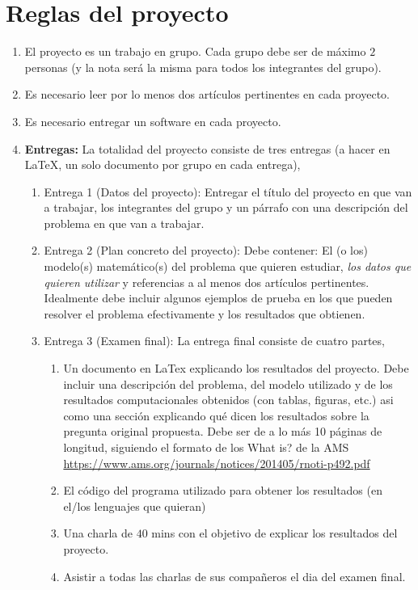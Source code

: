 \documentclass[12pt, a4paper]{article}
\begin{document}
\section{Reglas del proyecto}
\begin{enumerate}
\item{El proyecto es un trabajo en grupo. Cada grupo debe ser de m\'aximo $2$ personas (y la nota ser\'a la misma para todos los integrantes del grupo).}
\item{Es necesario leer por lo menos dos art\'iculos pertinentes en cada proyecto.}
\item{Es necesario entregar un software en cada proyecto. }
\item{{\bf Entregas:} La totalidad del proyecto consiste de tres entregas (a hacer en LaTeX, un solo documento por grupo en cada entrega),
\begin{enumerate}
\item{Entrega 1 (Datos del proyecto): Entregar el t\'itulo del proyecto en que van a trabajar, los integrantes del grupo y un p\'arrafo con una descripci\'on del problema en que van a trabajar.}
\item{Entrega 2 (Plan concreto del proyecto): Debe contener: El (o los) modelo(s) matem\'atico(s) del problema que quieren estudiar, {\it los datos que quieren utilizar} y referencias a al menos dos art\'iculos pertinentes. Idealmente debe incluir algunos ejemplos de prueba en los que pueden resolver el problema efectivamente y los resultados que obtienen.}
\item{Entrega 3 (Examen final): La entrega final consiste de cuatro partes,
\begin{enumerate}
\item{Un documento en LaTex explicando los resultados del proyecto. Debe incluir una descripci\'on del problema, del modelo utilizado y de los resultados computacionales obtenidos (con tablas, figuras, etc.) asi como una secci\'on explicando qu\'e dicen los resultados sobre la pregunta original propuesta. Debe ser de a lo m\'as 10 p\'aginas de longitud, siguiendo el formato de los What is? de la AMS
\url{https://www.ams.org/journals/notices/201405/rnoti-p492.pdf}

}
\item{El c\'odigo del programa utilizado para obtener los resultados (en el/los lenguajes que quieran)}
\item{Una charla de $40$ mins con el objetivo de explicar los resultados del proyecto.}
\item{Asistir a todas las charlas de sus compa\~neros el dia del examen final.}
\end{enumerate}
}
\end{enumerate}

}
\end{enumerate}
\end{document}
